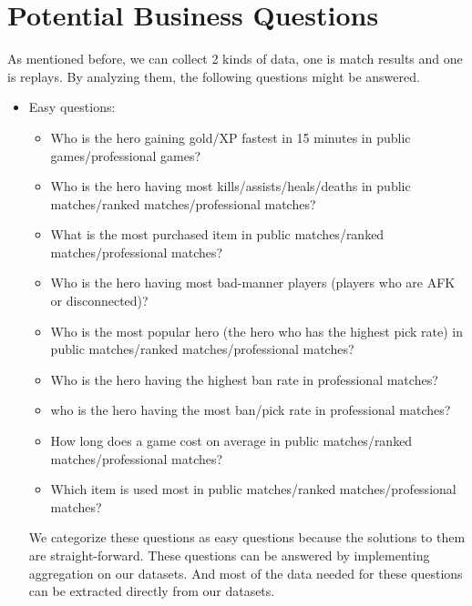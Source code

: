 \documentclass{article}
\begin{document}
\section{Potential Business Questions}

As mentioned before, we can collect 2 kinds of data, one is match results and one is replays.
By analyzing them, the following questions might be answered.

\begin{itemize}
    \item Easy questions:
    \begin{itemize}
        \item Who is the hero gaining \gls{gold}/\gls{XP} fastest in 15 minutes in public games/professional games?
        \item Who is the hero having most kills/assists/heals/deaths in \gls{public matches}/\gls{ranked matches}/\gls{professional matches}?
        \item What is the most purchased item in \gls{public matches}/\gls{ranked matches}/\gls{professional matches}?
        \item Who is the hero having most bad-manner players (players who are \gls{AFK} or disconnected)?
        \item Who is the most popular hero (the hero who has the highest pick rate) in \gls{public matches}/\gls{ranked matches}/\gls{professional matches}?
        \item Who is the hero having the highest ban rate in \gls{professional matches}?
        \item who is the hero having the most \gls{ban}/\gls{pick} rate in \gls{professional matches}?
        \item How long does a game cost on average in \gls{public matches}/\gls{ranked matches}/\gls{professional matches}?
        \item Which item is used most in \gls{public matches}/\gls{ranked matches}/\gls{professional matches}?
    \end{itemize}
    We categorize these questions as easy questions because the solutions to them are straight-forward. These questions can be answered by implementing aggregation on our datasets. And most of the data needed for these questions can be extracted directly from our datasets.
    \\


\end{itemize}
\end{document}

